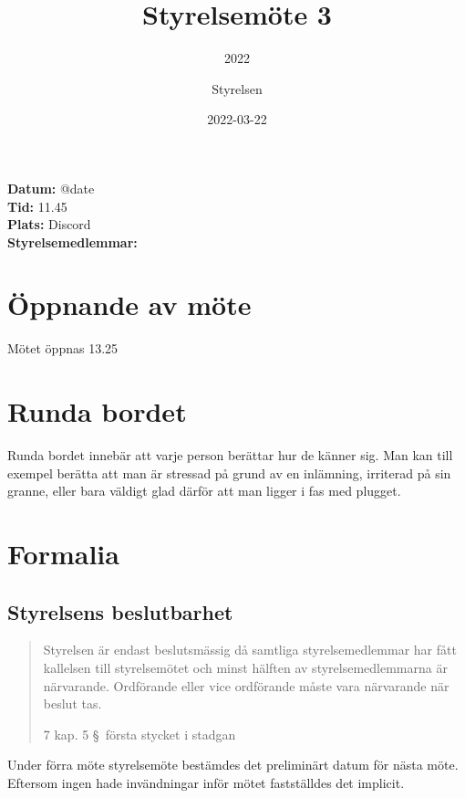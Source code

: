 \documentclass[protokoll]{dvd}
\begin{document}
\title{Styrelsemöte 3}
\subtitle{2022}
\author{Styrelsen}
\date{2022-03-22}

\textbf{Datum:} \csname @date\endcsname\\
\textbf{Tid:} 11.45\\
\textbf{Plats:} Discord\\
\textbf{Styrelsemedlemmar:}
\begin{närvarande_förtroendevalda}
\end{närvarande_förtroendevalda}


\section{Öppnande av möte}

Mötet öppnas 13.25

\section{Runda bordet}

    Runda bordet innebär att varje person berättar hur de känner sig.
    Man kan till exempel berätta att man är stressad på grund av en inlämning, irriterad på sin granne, eller bara väldigt glad därför att man ligger i fas med plugget.

\section{Formalia}

    \subsection{Styrelsens beslutbarhet}

        \blockquote[7 kap. 5 \S~första stycket i stadgan][]{
            Styrelsen är endast beslutsmässig då samtliga styrelsemedlemmar har fått kallelsen till styrelsemötet och minst hälften av styrelsemedlemmarna är närvarande.
            Ordförande eller vice ordförande måste vara närvarande när beslut tas.
        }

        Under förra möte styrelsemöte bestämdes det preliminärt datum för nästa möte. Eftersom ingen hade invändningar inför mötet fastställdes det implicit. 
\end{document}
